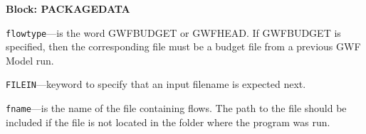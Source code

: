 
\item \textbf{Block: PACKAGEDATA}

\begin{description}
\item \texttt{flowtype}---is the word GWFBUDGET or GWFHEAD.  If GWFBUDGET is specified, then the corresponding file must be a budget file from a previous GWF Model run.

\item \texttt{FILEIN}---keyword to specify that an input filename is expected next.

\item \texttt{fname}---is the name of the file containing flows.  The path to the file should be included if the file is not located in the folder where the program was run.

\end{description}

